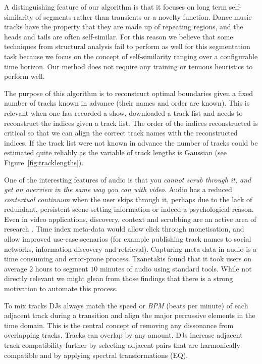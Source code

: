 \documentclass[twocolumn]{article}
\begin{document}
	A distinguishing feature of our algorithm is that it focuses on long term self-similarity of segments rather than transients or a novelty function. Dance music tracks have the property that they are made up of repeating regions, and the heads and tails are often self-similar. For this reason we believe that some techniques from structural analysis fail to perform as well for this segmentation task because we focus on the concept of self-similarity ranging over a configurable time horizon. Our method does not require any training or tenuous heuristics to perform well. 
	
	The purpose of this algorithm is to reconstruct optimal boundaries given a fixed number of tracks known in advance (their names and order are known). This is relevant when one has recorded a show, downloaded a track list and needs to reconstruct the indices given a track list. The order of the indices reconstructed is critical so that we can align the correct track names with the reconstructed indices. If the track list were not known in advance the number of tracks could be estimated quite reliably as the variable of track lengths is Gaussian (see Figure~\ref{fig:tracklengths}).
	
	One of the interesting features of audio is that you \textit{cannot scrub through it, and get an overview in the same way you can with video}. Audio has a reduced \textit{contextual continuum} when the user skips through it, perhaps due to the lack of redundant, persistent scene-setting information or indeed a psychological reason. Even in video applications, discovery, context and scrubbing are an active area of research \cite{Matejka:2013:SIO:2470654.2466149}. Time index meta-data would allow click through monetisation, and allow improved use-case scenarios (for example publishing track names to social networks, information discovery and retrieval). Capturing meta-data in audio is a time consuming and error-prone process. Tzanetakis \cite{tzanetakis1999framework} found that it took users on average $2$ hours to segment $10$ minutes of audio using standard tools. While not directly relevant we might glean from those findings that there is a strong motivation to automate this process.
	
	To mix tracks DJs always match the speed or \textit{BPM} (beats per minute) of each adjacent track during a transition and align the major percussive elements in the time domain. This is the central concept of removing any dissonance from overlapping tracks. Tracks can overlap by any amount. DJs increase adjacent track compatibility further by selecting adjacent pairs that are harmonically compatible and by applying spectral transformations (EQ).
	
\end{document}
